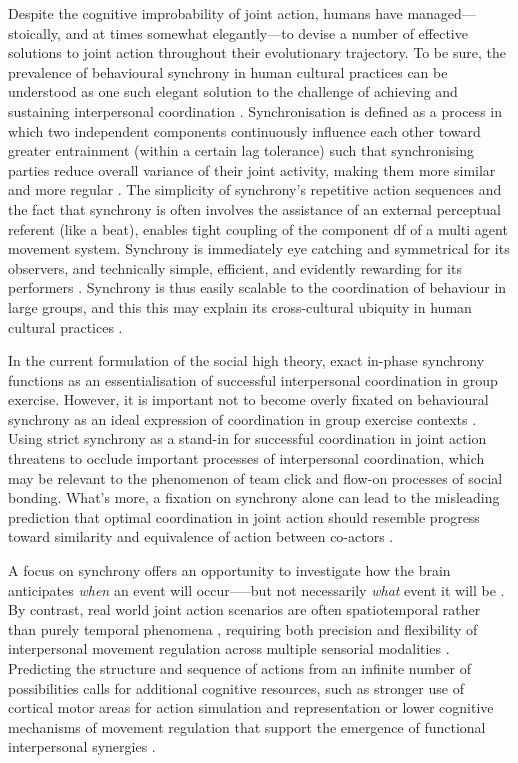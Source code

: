 \begin{CJK}{UTF8}{gbsn}
Despite the cognitive improbability of joint action, humans have managed---stoically, and at times somewhat elegantly---to devise a number of effective solutions to joint action throughout their evolutionary trajectory.  To be sure, the prevalence of behavioural synchrony in human cultural practices can be understood as one such elegant solution to the challenge of achieving and sustaining interpersonal coordination \citep{McNeill1995}.  Synchronisation is defined as a process in which two independent components continuously influence each other toward greater entrainment (within a certain lag tolerance) such that synchronising parties reduce overall variance of their joint activity, making them more similar and more regular \citep{Pikovsky2007}.  The simplicity of synchrony's repetitive action sequences and the fact that synchrony is often involves the assistance of an external perceptual referent (like a beat), enables tight coupling of the component df of a multi agent movement system.  Synchrony is immediately eye catching and symmetrical for its observers, and technically simple, efficient, and evidently rewarding  for its performers \citep{Mogan2017}.  Synchrony is thus easily scalable to the coordination of behaviour in large groups, and this this may explain its cross-cultural ubiquity in human cultural practices \citep{Dunbar2010,Tarr2016}.

In the current formulation of the social high theory, exact in-phase synchrony functions as an essentialisation of successful interpersonal coordination in group exercise.  However, it is important not to become overly fixated on behavioural synchrony as an ideal expression of coordination in group exercise contexts \citep{Keller2014}.  Using strict synchrony as a stand-in for successful coordination in joint action threatens to occlude important processes of interpersonal coordination, which may be relevant to the phenomenon of team click and flow-on processes of social bonding.  What's more, a fixation on synchrony alone can lead to the misleading prediction that optimal coordination in joint action should resemble progress toward similarity and equivalence of action between co-actors \citep{Fusaroli2014}.

A focus on synchrony offers an opportunity to investigate how the brain anticipates \textit{when} an event will occur—--but not necessarily \textit{what} event it will be \citep{Novembre2014}. By contrast, real world joint action scenarios are often spatiotemporal rather than purely temporal phenomena \citep{Phillips-Silver2012}, requiring both precision and flexibility of interpersonal movement regulation across multiple sensorial modalities \citep{Keller2014}. Predicting the structure and sequence of actions from an infinite number of possibilities calls for additional cognitive resources, such as stronger use of cortical motor areas for action simulation and representation \citep{Bekkering2009} or lower cognitive mechanisms of movement regulation that support the emergence of functional interpersonal synergies \citep{Riley2011}.


\end{CJK}
